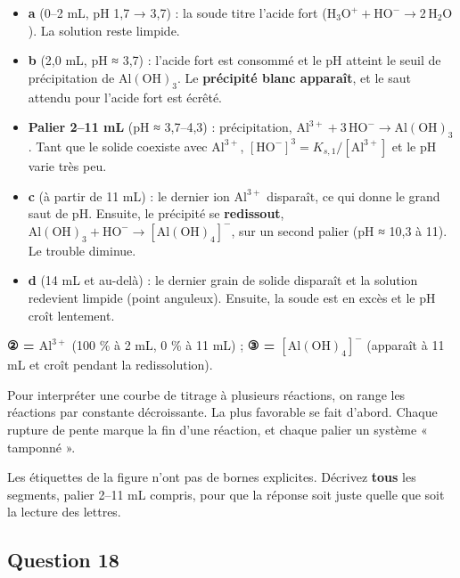 \documentclass[11pt,a4paper]{article}
\providecommand{\tightlist}{\setlength{\itemsep}{0pt}\setlength{\parskip}{0pt}}
\begin{document}
\begin{itemize}
\tightlist
\item
  \textbf{a} (0--2 mL, pH 1,7 → 3,7) : la soude titre l'acide fort (\(\mathrm{H_3O^+}+\mathrm{HO^-}\to2\,\mathrm{H_2O}\)). La solution reste limpide.
\item
  \textbf{b} (2,0 mL, pH ≈ 3,7) : l'acide fort est consommé et le pH atteint le seuil de précipitation de \(\mathrm{Al(OH)_3}\). Le \textbf{précipité blanc apparaît}, et le saut attendu pour l'acide fort est écrêté.
\item
  \textbf{Palier 2--11 mL} (pH ≈ 3,7--4,3) : précipitation, \(\mathrm{Al^{3+}}+3\,\mathrm{HO^-}\to\mathrm{Al(OH)_3}\). Tant que le solide coexiste avec \(\mathrm{Al^{3+}}\), \([\mathrm{HO^-}]^3=K_{s,1}/[\mathrm{Al^{3+}}]\) et le pH varie très peu.
\item
  \textbf{c} (à partir de 11 mL) : le dernier ion \(\mathrm{Al^{3+}}\) disparaît, ce qui donne le grand saut de pH. Ensuite, le précipité se \textbf{redissout}, \(\mathrm{Al(OH)_3}+\mathrm{HO^-}\to[\mathrm{Al(OH)_4}]^-\), sur un second palier (pH ≈ 10,3 à 11). Le trouble diminue.
\item
  \textbf{d} (14 mL et au-delà) : le dernier grain de solide disparaît et la solution redevient limpide (point anguleux). Ensuite, la soude est en excès et le pH croît lentement.
\end{itemize}

\textbf{② = \(\mathrm{Al^{3+}}\)} (100 \% à 2 mL, 0 \% à 11 mL) ; \textbf{③ = \([\mathrm{Al(OH)_4}]^-\)} (apparaît à 11 mL et croît pendant la redissolution).

\begin{methode}

Pour interpréter une courbe de titrage à plusieurs réactions, on range les réactions par constante décroissante. La plus favorable se fait d'abord. Chaque rupture de pente marque la fin d'une réaction, et chaque palier un système « tamponné ».

\end{methode}

\begin{piege}

Les étiquettes de la figure n'ont pas de bornes explicites. Décrivez \textbf{tous} les segments, palier 2--11 mL compris, pour que la réponse soit juste quelle que soit la lecture des lettres.

\end{piege}

\hypertarget{question-18}{%
\subsection{Question 18}\label{question-18}}
\end{document}
